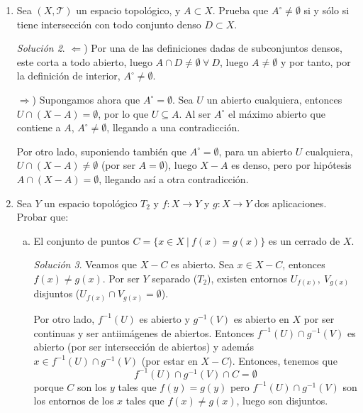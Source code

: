 \documentclass[12pt,twoside]{report}
\newcommand\mc[1]{\mathcal{#1}}
\theoremstyle{azul}
\theoremstyle{azul2}
\theoremstyle{plain}
\theoremstyle{definition}
\theoremstyle{remark}
\newtheorem*{sol}{Solución}
\begin{document}
\begin{enumerate}
\begin{sol}
Veamos ahora que $\partial(A)=A$. En especial, $\partial(\{a\})=\{a\}$ ya que $\{a\}=B(c,r)\cap\{a\}$ y $B(c,r) \cap (X-\{a\}) \neq \emptyset$, luego todo abierto corta a $\{a\}$ y a $X-\{a\}$, por tanto $\{a\}$ es un punto frontera. Ahora dado que 
$$A = \bigcup_{i=1}^n\{a_i\} \: \Rightarrow \: \partial(A)=\partial\left(\bigcup_{i=1}^n\{a_i\}\right)=\bigcup_{i=1}^n \partial(\{a_i\})=\bigcup_{i=1}^n\{a_i\}=A$$
\end{sol}
\item Sea $(X, \mc{T})$ un espacio topológico, y $A \subset X$. Prueba que $A^{\circ} \neq \emptyset$ si y sólo si tiene intersección con todo conjunto denso $D \subset X$.
\begin{sol} \justifying
$\Leftarrow$) Por una de las definiciones dadas de subconjuntos densos, este corta a todo abierto, luego $A \cap D \neq \emptyset \: \forall \: D$, luego $A \neq \emptyset$ y por tanto, por la definición de interior, $A^{\circ} \neq \emptyset$. 

$\Rightarrow$) Supongamos ahora que $A^{\circ}= \emptyset$. Sea $U$ un abierto cualquiera, entonces $U \cap (X-A)=\emptyset$, por lo que $U \subseteq A$. Al ser $A^{\circ}$ el máximo abierto que contiene a $A$, $A^{\circ}\neq \emptyset$, llegando a una contradicción.  

Por otro lado, suponiendo también que $A^{\circ}= \emptyset$, para un abierto $U$ cualquiera, $U \cap (X-A) \neq \emptyset$ (por ser $A= \emptyset$), luego $X-A$ es denso, pero por hipótesis $A \cap (X-A)=\emptyset$, llegando así a otra contradicción. 
\end{sol}
\item Sea $Y$ un espacio topológico $T_2$ y $f: X \longrightarrow Y$ y $g: X \longrightarrow Y$ dos aplicaciones. Probar que:
\begin{enumerate}[a)]
    \item El conjunto de puntos $C=\{x \in X \: | \: f(x)=g(x)\}$ es un cerrado de $X$.
    \begin{sol}
    Veamos que $X-C$ es abierto. Sea $x \in X-C$, entonces $f(x) \neq g(x)$. Por ser $Y$ separado ($T_2$), existen entornos $U_{f(x)}, \: V_{g(x)}$ disjuntos ($U_{f(x)} \cap V_{g(x)} = \emptyset$). 
    
    Por otro lado, $f^{-1}(U)$ es abierto y $g^{-1}(V)$ es abierto en $X$ por ser continuas y ser antiimágenes de abiertos. Entonces $f^{-1}(U) \cap g^{-1}(V)$ es abierto (por ser intersección de abiertos) y además $x \in f^{-1}(U) \cap g^{-1}(V)$ (por estar en $X-C$). Entonces, tenemos que $$f^{-1}(U) \cap g^{-1}(V) \cap C = \emptyset$$
    porque $C$ son los $y$ tales que $f(y)=g(y)$ pero $f^{-1}(U) \cap g^{-1}(V)$ son los entornos de los $x$ tales que $f(x) \neq g(x)$, luego son disjuntos. 
    

\end{sol}
\end{enumerate}
\end{enumerate}
\end{document}
